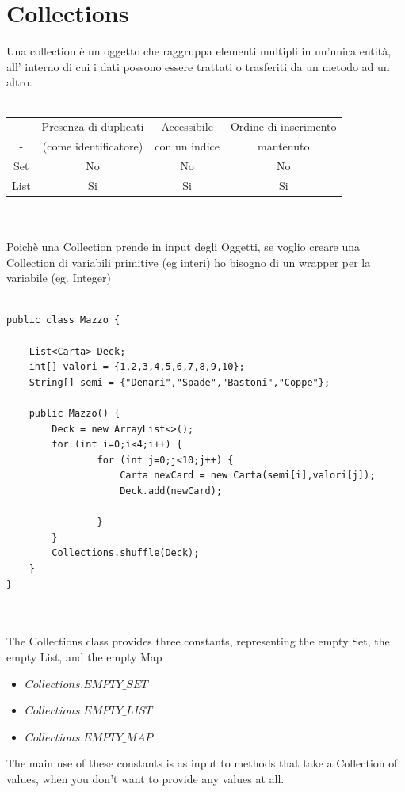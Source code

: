 \documentclass[10pt,a4paper]{book}
\begin{document}
\section{Collections}
Una collection è un oggetto che raggruppa elementi multipli in un'unica entità, all' interno di cui i dati possono essere trattati o trasferiti da un metodo ad un altro.\\\\
\begin{tabular}{|c|c|c|c|}
\hline 
- & Presenza di duplicati  & Accessibile  & Ordine di inserimento\\
- & (come identificatore) & con un indice & mantenuto \\
\hline 
Set & No & No & No \\ 
\hline 
List & Si & Si & Si \\ 
\hline 
\end{tabular} 
\\\\
Poichè una Collection prende in input degli Oggetti, se voglio creare una Collection di variabili primitive (eg interi) ho bisogno di un wrapper per la variabile (eg. Integer)\\\\
\begin{verbatim}
public class Mazzo {
    
    List<Carta> Deck;
    int[] valori = {1,2,3,4,5,6,7,8,9,10};
    String[] semi = {"Denari","Spade","Bastoni","Coppe"};
    
    public Mazzo() {
        Deck = new ArrayList<>();
        for (int i=0;i<4;i++) {
                for (int j=0;j<10;j++) {
                    Carta newCard = new Carta(semi[i],valori[j]);
                    Deck.add(newCard);
                    
                }
        }
        Collections.shuffle(Deck);
    }
}

\end{verbatim}
\\\\
The Collections class provides three constants, representing the empty Set, the empty List, and the 
empty Map 
\begin{itemize}
\item $Collections.EMPTY\_SET $
\item $Collections.EMPTY\_LIST $
\item $Collections.EMPTY\_MAP $
\end{itemize}
The main use of these constants is as input to methods that take a Collection of values, when you 
don't want to provide any values at all. 
\end{document}
